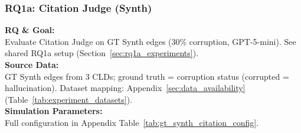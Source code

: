 \subsubsection{RQ1a: Citation Judge (Synth)}
\label{sec:rq1a_citation_synth}

\textbf{RQ \& Goal:}\\
Evaluate Citation Judge on GT Synth edges (30\% corruption, GPT-5-mini). See shared RQ1a setup (Section~\ref{sec:rq1a_experiments}).\\
\textbf{Source Data:}\\
GT Synth edges from 3 CLDs; ground truth = corruption status (corrupted = hallucination). Dataset mapping: Appendix~\ref{sec:data_availability} (Table~\ref{tab:experiment_datasets}).\\
\textbf{Simulation Parameters:}\\
Full configuration in Appendix Table~\ref{tab:gt_synth_citation_config}.\\


